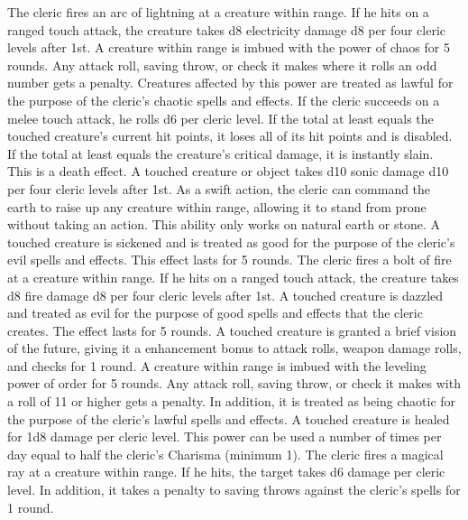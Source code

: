  The cleric fires an arc of lightning at a creature within \rngmed range. If he hits on a ranged touch attack, the creature takes d8 electricity damage \add d8 per four cleric levels after 1st.
 A creature within \rngclose range is imbued with the power of chaos for 5 rounds. Any attack roll, saving throw, or check it makes where it rolls an odd number gets a  penalty. Creatures affected by this power are treated as lawful for the purpose of the cleric's chaotic spells and effects.
 If the cleric succeeds on a melee touch attack, he rolls d6 per cleric level. If the total at least equals the touched creature's current hit points, it loses all of its hit points and is disabled. If the total at least equals the creature's critical damage, it is instantly slain. This is a death effect.
 A touched creature or object takes d10 sonic damage \add d10 per four cleric levels after 1st.
 As a swift action, the cleric can command the earth to raise up any creature within \rngclose range, allowing it to stand from prone without taking an action. This ability only works on natural earth or stone.
 A touched creature is sickened and is treated as good for the purpose of the cleric's evil spells and effects. This effect lasts for 5 rounds.
 The cleric fires a bolt of fire at a creature within \rngclose range. If he hits on a ranged touch attack, the creature takes d8 fire damage \add d8 per four cleric levels after 1st.
 A touched creature is dazzled and treated as evil for the purpose of good spells and effects that the cleric creates. The effect lasts for 5 rounds.
 A touched creature is granted a brief vision of the future, giving it a  enhancement bonus to attack rolls, weapon damage rolls, and checks for 1 round.
 A creature within \rngclose range is imbued with the leveling power of order for 5 rounds. Any attack roll, saving throw, or check it makes with a roll of 11 or higher gets a  penalty. In addition, it is treated as being chaotic for the purpose of the cleric's lawful spells and effects.
 A touched creature is healed for 1d8 damage per cleric level. This power can be used a number of times per day equal to half the cleric's Charisma (minimum 1).
 The cleric fires a magical ray at a creature within \rngclose range. If he hits, the target takes d6 damage  per cleric level. In addition, it takes a  penalty to saving throws against  the cleric's spells for 1 round.
